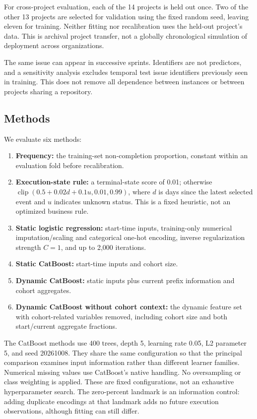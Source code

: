 \documentclass[11pt,a4paper]{article}
\providecommand{\tightlist}{\setlength{\itemsep}{0pt}\setlength{\parskip}{0pt}}
\begin{document}
For cross-project evaluation, each of the 14 projects is held out once. Two of the other 13 projects are selected for validation using the fixed random seed, leaving eleven for training. Neither fitting nor recalibration uses the held-out project's data. This is archival project transfer, not a globally chronological simulation of deployment across organizations.

The same issue can appear in successive sprints. Identifiers are not predictors, and a sensitivity analysis excludes temporal test issue identifiers previously seen in training. This does not remove all dependence between instances or between projects sharing a repository.

\subsection{Methods}\label{methods}

We evaluate six methods:

\begin{enumerate}
\def\labelenumi{\arabic{enumi}.}
\tightlist
\item
  \textbf{Frequency:} the training-set non-completion proportion, constant within an evaluation fold before recalibration.
\item
  \textbf{Execution-state rule:} a terminal-state score of 0.01; otherwise \(\operatorname{clip}(0.5+0.02d+0.1u,0.01,0.99)\), where \(d\) is days since the latest selected event and \(u\) indicates unknown status. This is a fixed heuristic, not an optimized business rule.
\item
  \textbf{Static logistic regression:} start-time inputs, training-only numerical imputation/scaling and categorical one-hot encoding, inverse regularization strength \(C=1\), and up to 2,000 iterations.
\item
  \textbf{Static CatBoost:} start-time inputs and cohort size.
\item
  \textbf{Dynamic CatBoost:} static inputs plus current prefix information and cohort aggregates.
\item
  \textbf{Dynamic CatBoost without cohort context:} the dynamic feature set with cohort-related variables removed, including cohort size and both start/current aggregate fractions.
\end{enumerate}

The CatBoost methods use 400 trees, depth 5, learning rate 0.05, L2 parameter 5, and seed 20261008. They share the same configuration so that the principal comparison examines input information rather than different learner families. Numerical missing values use CatBoost's native handling. No oversampling or class weighting is applied. These are fixed configurations, not an exhaustive hyperparameter search. The zero-percent landmark is an information control: adding duplicate encodings at that landmark adds no future execution observations, although fitting can still differ.
\end{document}
